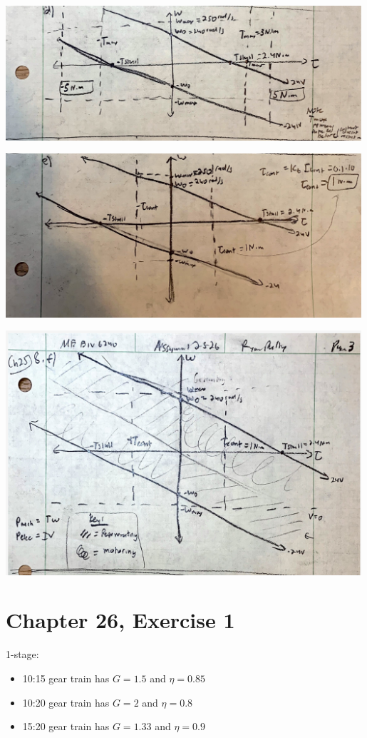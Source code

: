 \documentclass[12pt]{article}
\begin{document}
\begin{center}
\includegraphics[width=5.2in]{25_8d.png}

\includegraphics[width=5.2in]{25_8e.png}

\includegraphics[width=5.2in]{25_8f.png}

\end{center}

\section*{Chapter 26, Exercise 1}
1-stage:
\begin{itemize}
    \item 
    10:15 gear train has $G=1.5$ and $\eta = 0.85$

    \item 
    10:20 gear train has $G=2$ and $\eta = 0.8$

    \item 
    15:20 gear train has $G=1.33$ and $\eta = 0.9$
\end{itemize}
\end{document}

